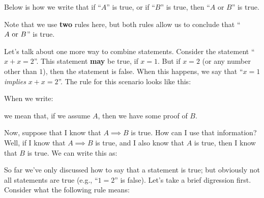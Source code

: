 Below is how we write that if ``$A$'' is true, or if ``$B$'' is true, then ``$A$ or $B$'' is true.

\begin{mathpar}

\end{mathpar}

Note that we use \textbf{two} rules here, but both rules allow us to conclude that ``$A \tor B$'' is true.

Let's talk about one more way to combine statements.
Consider the statement ``$x + x = 2$''.
This statement \textbf{may} be true, if $x = 1$.
But if $x = 2$ (or any number other than $1$), then the statement is false.
When this happens, we say that ``$x = 1$ \emph{implies} $x + x = 2$''.
The rule for this scenario looks like this:

\begin{mathpar}
\end{mathpar}

When we write:

\begin{mathpar}
\end{mathpar}

we mean that, if we assume $A$, then we have some proof of $B$.

Now, suppose that I know that $A \implies B$ is true.
How can I use that information?
Well, if I know that $A \implies B$ is true, and I also know that $A$ is true, then I know that $B$ is true.
We can write this as:

\begin{mathpar}
\end{mathpar}

So far we've only discussed how to say that a statement is true; but obviously not all statements are true (e.g., ``$1 = 2$'' is false).
Let's take a brief digression first.
Consider what the following rule means:

